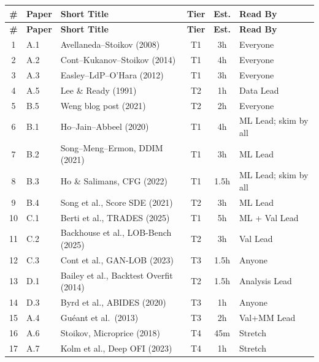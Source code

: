 \documentclass[11pt,a4paper]{article}
\begin{document}
\begin{center}
\small
\renewcommand{\arraystretch}{1.25}
\begin{longtable}{cllccl}
\toprule
\textbf{\#} & \textbf{Paper} & \textbf{Short Title} & \textbf{Tier} & \textbf{Est.} & \textbf{Read By} \\
\midrule
\endfirsthead
\toprule
\textbf{\#} & \textbf{Paper} & \textbf{Short Title} & \textbf{Tier} & \textbf{Est.} & \textbf{Read By} \\
\midrule
\endhead
1 & A.1 & Avellaneda--Stoikov (2008) & \textcolor{tier1}{T1} & 3h & Everyone \\
2 & A.2 & Cont--Kukanov--Stoikov (2014) & \textcolor{tier1}{T1} & 4h & Everyone \\
3 & A.3 & Easley--LdP--O'Hara (2012) & \textcolor{tier1}{T1} & 3h & Everyone \\
4 & A.5 & Lee \& Ready (1991) & \textcolor{tier2}{T2} & 1h & Data Lead \\
\midrule
5 & B.5 & Weng blog post (2021) & \textcolor{tier2}{T2} & 2h & Everyone \\
6 & B.1 & Ho--Jain--Abbeel (2020) & \textcolor{tier1}{T1} & 4h & ML Lead; skim by all \\
7 & B.2 & Song--Meng--Ermon, DDIM (2021) & \textcolor{tier1}{T1} & 3h & ML Lead \\
8 & B.3 & Ho \& Salimans, CFG (2022) & \textcolor{tier1}{T1} & 1.5h & ML Lead; skim by all \\
9 & B.4 & Song et al., Score SDE (2021) & \textcolor{tier2}{T2} & 3h & ML Lead \\
\midrule
10 & C.1 & Berti et al., TRADES (2025) & \textcolor{tier1}{T1} & 5h & ML + Val Lead \\
11 & C.2 & Backhouse et al., LOB-Bench (2025) & \textcolor{tier2}{T2} & 3h & Val Lead \\
12 & C.3 & Cont et al., GAN-LOB (2023) & \textcolor{tier3}{T3} & 1.5h & Anyone \\
\midrule
13 & D.1 & Bailey et al., Backtest Overfit (2014) & \textcolor{tier2}{T2} & 1.5h & Analysis Lead \\
14 & D.3 & Byrd et al., ABIDES (2020) & \textcolor{tier3}{T3} & 1h & Anyone \\
\midrule
15 & A.4 & Gu\'eant et al.\ (2013) & \textcolor{tier3}{T3} & 2h & Val+MM Lead \\
16 & A.6 & Stoikov, Microprice (2018) & \textcolor{tier4}{T4} & 45m & Stretch \\
17 & A.7 & Kolm et al., Deep OFI (2023) & \textcolor{tier4}{T4} & 1h & Stretch \\

\end{longtable}
\end{center}
\end{document}
